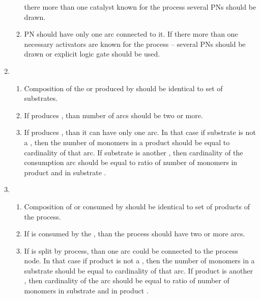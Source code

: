 \begin{enumerate}
\begin{enumerate}
    there more than one catalyst known for the process several PNs should be
    drawn. 
    \item PN should have only one  arc connected to it. If
    there more than one necessary activators are known for the process -- several PNs should be
    drawn or explicit logic gate should be used.  
  \end{enumerate}  
    \item {}
  \begin{enumerate}
    \item Composition of the  or  produced by
     should be identical to set of  substrates.
    \item If  produces , than number of 
     arcs should be two or more.
    \item If  produces , than it can have only one 
     arc. In that case if substrate is not a
    , then the number of monomers in a product 
    should be equal to cardinality of that arc. If substrate is another
    , then cardinality of the consumption arc should be equal to
    ratio of number of monomers in product and in substrate .
  \end{enumerate}  
    \item {}
  \begin{enumerate}
    \item Composition of  or  consumed by
     should be identical to set of products of the process.
    \item If  is consumed by the , than the
    process should have two or more  arcs.
    \item If  is split by  process, than
    one  arc could be connected to the process node. In that case if product is not a
    , then the number of monomers in a substrate 
    should be equal to cardinality of that arc. If product is another
    , then cardinality of the  arc should be equal to
    ratio of number of monomers in substrate and in product .
  \end{enumerate}  
  
  
\end{enumerate}

